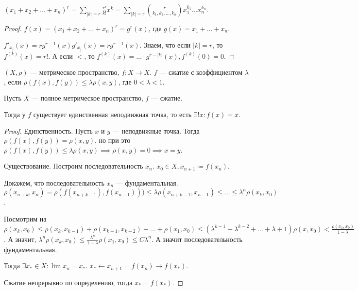 \begin{consequence}
    $(x_1 + x_2 + \ldots + x_n)^r = \sum_{|k| = r} \frac{r!}{k!}x^k = \sum_{|k| = r} \binom{r}{k_1, k_2, \ldots, k_n} x_1^{k_1}\ldots x_n^{k_n}$.
\end{consequence}
\begin{proof}
    $f(x) = (x_1 + x_2 + \ldots + x_n)^r = g^r(x)$, где $g(x) = x_1 + \ldots + x_n$.

    $f'_{x_j}(x) = rg^{r-1}(x) g'_{x_j}(x) = r g^{r-1}(x)$. Знаем, что если $|k| = r$, то  $f^{(k)}(x) = r!$. А если  $<$, то  $f^{(k)}(x) = \ldots \cdot g^{r-|k|}(x), f^{(k)}(0) = 0$.
\end{proof}
\begin{definition}
    $(X, \rho)$ --- метрическое пространство,  $f\!: X \to X$.  $f$ --- сжатие с коэффициентом $\lambda$, если  $\rho(f(x), f(y)) \le \lambda \rho(x, y)$, где $0 < \lambda < 1$.
\end{definition}
\begin{theorem}
    Пусть $X$ --- полное метрическое пространство,  $f$ --- сжатие.

    Тогда у  $f$ существует единственная неподвижная точка, то есть  $\exists! x\!: f(x) = x$.
\end{theorem}
\begin{proof}
    Единственность. Пусть $x$ и  $y$ --- неподвижные точка. Тогда  $\rho(f(x), f(y)) = \rho(x, y)$, но при это  $\rho(f(x), f(y)) \le \lambda\rho(x, y) \implies \rho(x, y) = 0 \implies x = y$.

    Существование. Построим последовательность $x_n$.  $x_0 \in X, x_{n+1} \coloneqq f(x_n)$.

    Докажем, что последовательность  $x_n$ --- фундаментальная.  $\rho(x_{n+k}, x_n) = \rho(f(x_{n+k-1}), f(x_{n-1}))) \le \lambda \rho(x_{n+k-1}, x_{n-1}) \le \ldots \le \lambda^n \rho(x_k, x_0)$. 

    Посмотрим на $\rho(x_k, x_0) \le \rho(x_k, x_{k-1}) + \rho(x_{k-1}, x_{k-2}) + \ldots + \rho(x_1, x_0) \le (\lambda^{k-1} + \lambda^{k-2} + \ldots + \lambda +1) \rho(x, x_0) < \frac{\rho(x_1, x_0)}{1-\lambda}$. А значит, $\lambda^n \rho(x_{k}, x_0) \le \frac{\lambda^n}{1-\lambda} \rho(x_1, x_0) \le C\lambda^n$. А значит последовательность фундаментальная.

    Тогда $\exists x_* \in X\!: \lim x_n = x_*$. $x_* \leftarrow x_{n+1} = f(x_n) \to f(x_*)$. 

    Сжатие непрерывно по определению, тогда $x_* = f(x_*)$.
\end{proof}
